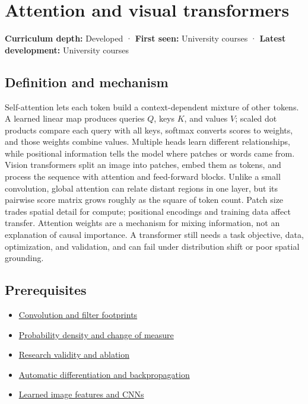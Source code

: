 \hypertarget{appendix-a9d5dfdd164a}{}\label{referencestart:appendix-a9d5dfdd164a}
\section{Attention and visual transformers}\label{appendix-a9d5dfdd164a-attention-and-visual-transformers}

\textbf{Curriculum depth:} Developed · \textbf{First seen:} University courses · \textbf{Latest development:} University courses

\subsection{Definition and mechanism}\label{appendix-a9d5dfdd164a-definition-and-mechanism}

Self-attention lets each token build a context-dependent mixture of other tokens. A learned linear map produces queries \(Q\), keys \(K\), and values \(V\); scaled dot products compare each query with all keys, softmax converts scores to weights, and those weights combine values. Multiple heads learn different relationships, while positional information tells the model where patches or words came from. Vision transformers split an image into patches, embed them as tokens, and process the sequence with attention and feed-forward blocks. Unlike a small convolution, global attention can relate distant regions in one layer, but its pairwise score matrix grows roughly as the square of token count. Patch size trades spatial detail for compute; positional encodings and training data affect transfer. Attention weights are a mechanism for mixing information, not an explanation of causal importance. A transformer still needs a task objective, data, optimization, and validation, and can fail under distribution shift or poor spatial grounding.

\subsection{Prerequisites}\label{appendix-a9d5dfdd164a-prerequisites}

\begin{itemize}
\tightlist
\item
  \hyperref[appendix-d5b3c692d9f0]{Convolution and filter footprints}
\item
  \hyperref[appendix-4815cd87ab8b]{Probability density and change of measure}
\item
  \hyperref[appendix-65788587ef78]{Research validity and ablation}
\item
  \hyperref[appendix-40df0855b4a7]{Automatic differentiation and backpropagation}
\item
  \hyperref[appendix-47c51ea026fb]{Learned image features and CNNs}
\end{itemize}

